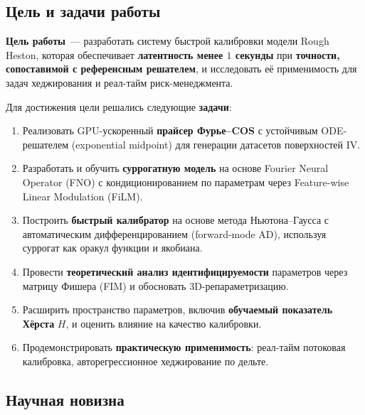 \subsection*{Цель и задачи работы}

\textbf{Цель работы}~--- разработать систему быстрой калибровки модели Rough Heston,
которая обеспечивает \textbf{латентность менее $1$ секунды} при \textbf{точности,
сопоставимой с референсным решателем}, и исследовать её применимость для задач
хеджирования и реал-тайм риск-менеджмента.

Для достижения цели решались следующие \textbf{задачи}:
\begin{enumerate}
  \item Реализовать GPU-ускоренный \textbf{прайсер Фурье--COS} с устойчивым
        ODE-решателем (exponential midpoint) для генерации датасетов поверхностей IV.
  \item Разработать и обучить \textbf{суррогатную модель} на основе
        Fourier Neural Operator (FNO) с кондиционированием по параметрам
        через Feature-wise Linear Modulation (FiLM).
  \item Построить \textbf{быстрый калибратор} на основе метода
        Ньютона--Гаусса с автоматическим дифференцированием (forward-mode AD),
        используя суррогат как оракул функции и якобиана.
  \item Провести \textbf{теоретический анализ идентифицируемости} параметров
        через матрицу Фишера (FIM) и обосновать 3D-репараметризацию.
  \item Расширить пространство параметров, включив \textbf{обучаемый показатель
        Хёрста} $H$, и оценить влияние на качество калибровки.
  \item Продемонстрировать \textbf{практическую применимость}: реал-тайм
        потоковая калибровка, авторегрессионное хеджирование по дельте.
\end{enumerate}

\subsection*{Научная новизна}

